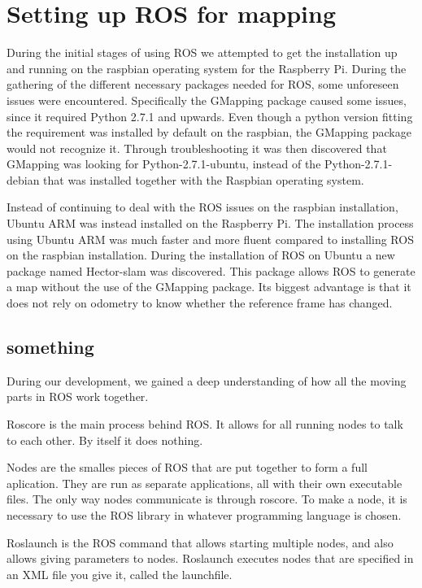 \clearpage
\section{Setting up ROS for mapping}

During the initial stages of using ROS we attempted to get the installation up and running on the raspbian operating system for the Raspberry Pi. During the gathering of the different necessary packages needed for ROS, some unforeseen issues were encountered. Specifically the GMapping package caused some issues, since it required Python 2.7.1 and upwards. Even though a python version fitting the requirement was installed by default on the raspbian, the GMapping package would not recognize it. Through troubleshooting it was then discovered that GMapping was looking for Python-2.7.1-ubuntu, instead of the Python-2.7.1-debian that was installed together with the Raspbian operating system.

Instead of continuing to deal with the ROS issues on the raspbian installation, Ubuntu ARM was instead installed on the Raspberry Pi.
The installation process using Ubuntu ARM was much faster and more fluent compared to installing ROS on the raspbian installation. During the installation of ROS on Ubuntu a new package named Hector-slam was discovered. 
This package allows ROS to generate a map without the use of the GMapping package. Its biggest advantage is that it does not rely on odometry to know whether the reference frame has changed.

\subsection{something}
During our development, we gained a deep understanding of how all the moving parts in ROS work together.

Roscore is the main process behind ROS. It allows for all running nodes to talk to each other. By itself it does nothing.

Nodes are the smalles pieces of ROS that are put together to form a full aplication. They are run as separate applications, all with their own executable files. The only way nodes communicate is through roscore. To make a node, it is necessary to use the ROS library in whatever programming language is chosen.

Roslaunch is the ROS command that allows starting multiple nodes, and also allows giving parameters to nodes. Roslaunch executes nodes that are specified in an XML file you give it, called the launchfile.

